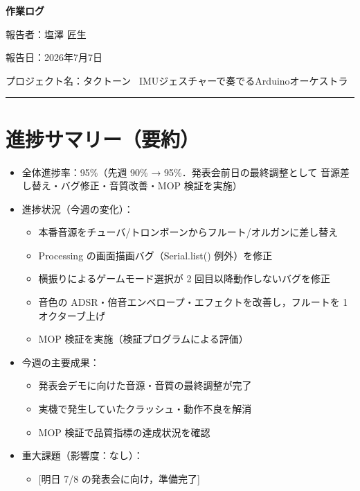 \documentclass[uplatex,dvipdfmx,a4paper,11pt]{jsarticle}
\newcommand{\sectionrule}{\par\medskip\noindent\rule{\linewidth}{0.6pt}\par\medskip}
\begin{document}
{\LARGE\bfseries 作業ログ}\par\bigskip

報告者：塩澤 匠生

報告日：2026年7月7日

プロジェクト名：タクトーン~ IMUジェスチャーで奏でるArduinoオーケストラ~ \\

\sectionrule

\section{進捗サマリー（要約）}

\begin{itemize}
  \item 全体進捗率：95\%（先週 90\% → 95\%．発表会前日の最終調整として
        音源差し替え・バグ修正・音質改善・MOP 検証を実施）
  \item 進捗状況（今週の変化）：
    \begin{itemize}
      \item 本番音源をチューバ/トロンボーンからフルート/オルガンに差し替え
      \item Processing の画面描画バグ（Serial.list() 例外）を修正
      \item 横振りによるゲームモード選択が 2 回目以降動作しないバグを修正
      \item 音色の ADSR・倍音エンベロープ・エフェクトを改善し，フルートを 1 オクターブ上げ
      \item MOP 検証を実施（検証プログラムによる評価）
    \end{itemize}
  \item 今週の主要成果：
    \begin{itemize}
      \item 発表会デモに向けた音源・音質の最終調整が完了
      \item 実機で発生していたクラッシュ・動作不良を解消
      \item MOP 検証で品質指標の達成状況を確認
    \end{itemize}
  \item 重大課題（影響度：なし）：
    \begin{itemize}
      \item {}[明日 7/8 の発表会に向け，準備完了]
    \end{itemize}
\end{itemize}
\end{document}
